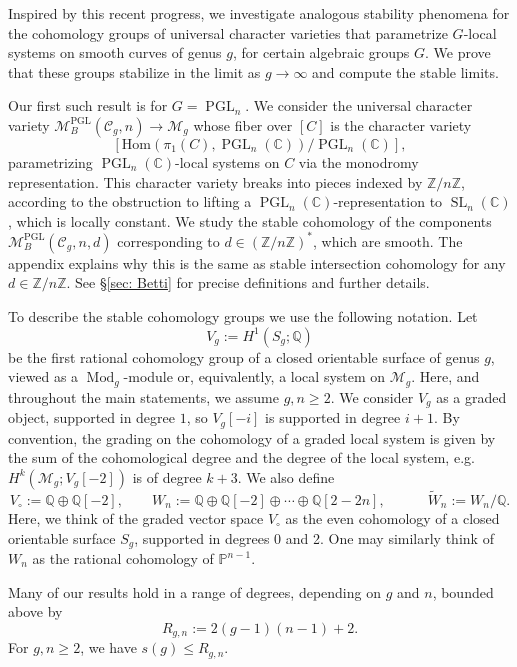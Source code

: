 \documentclass[11pt,reqno]{amsart}
\theoremstyle{plain} %
\theoremstyle{definition}
\newcommand{\QQ}{\mathbb{Q}}
\newcommand{\CC}{\mathbb{C}}
\newcommand{\PP}{\mathbb{P}}
\newcommand{\Hom}{\mathrm{Hom}}
\newcommand{\M}{\mathcal{M}}
\newcommand{\C}{\mathcal{C}}
\newcommand{\ZZ}{\mathbb{Z}}
\DeclareMathOperator{\SL}{SL}
\DeclareMathOperator{\PGL}{PGL}
\DeclareMathOperator{\Mod}{Mod}
\begin{document}
Inspired by this recent progress, we investigate analogous  stability phenomena for the cohomology groups of universal character varieties that parametrize $G$-local systems on smooth curves of genus $g$, for certain algebraic groups $G$. We prove that these groups stabilize in the limit as $g \to \infty$ and compute the stable limits.

Our first such result is for $G = \PGL_n$.  We consider the universal character variety $\M_B^{\PGL}(\C_g,n) \to \M_g$ whose fiber over $[C]$ is the character variety $$[\Hom(\pi_1(C), \PGL_n(\CC))/\PGL_n(\CC)],$$ parametrizing $\PGL_n(\CC)$-local systems on $C$ via the monodromy representation. This character variety breaks into pieces indexed by $\ZZ/n\ZZ$, according to the obstruction to lifting a $\PGL_n(\CC)$-representation to $\SL_n(\CC)$, which is locally constant. We study the stable cohomology of the components $\M_B^{\PGL}(\C_g, n,d)$ corresponding to $d \in (\ZZ/n\ZZ)^*$, which are smooth. The appendix explains why this is the same as stable intersection cohomology for any $d \in \ZZ/n\ZZ$. See \S \ref{sec: Betti} for precise definitions and further details.


To describe the stable cohomology groups we use the following notation. Let 
\begin{equation} \label{eq:Vg}
    V_g := H^1(S_g;\QQ)
\end{equation}
be the first rational cohomology group of a closed orientable surface of genus $g$, viewed as a $\Mod_g$-module or, equivalently, a local system on $\M_g$.  Here, and throughout the main statements, we assume $g,n\geq2$. We consider $V_g$ as a graded object, supported in degree $1$, so $V_g[-i]$ is supported in degree $i + 1$. By convention, the grading on the cohomology of a graded local system is given by the sum of the cohomological degree and the degree of the local system, e.g. $H^k(\M_g;V_g[-2])$ is of degree $k+3$. We also define
\begin{equation}\label{eq: grading}
V_\circ := \QQ \oplus \QQ[-2], \quad \quad W_n := \QQ \oplus \QQ[-2] \oplus \cdots \oplus \QQ[2-2n], \quad \quad %
\quad  \widetilde{W}_n := W_n / \QQ. %
\end{equation}
Here, we think of the graded vector space $V_\circ$ as the even cohomology of a closed orientable surface $S_g$, supported in degrees 0 and 2. One may similarly think of $W_n$ as the rational cohomology of $\PP^{n-1}$.

Many of our results hold in a range of degrees, depending on $g$ and $n$, bounded above by 
\begin{equation}\label{eq:tautological-range}
R_{g,n}:=2(g-1)(n-1)+2.
\end{equation}
For $g,n\geq 2$, we have $s(g)\leq R_{g,n}$.
\end{document}
